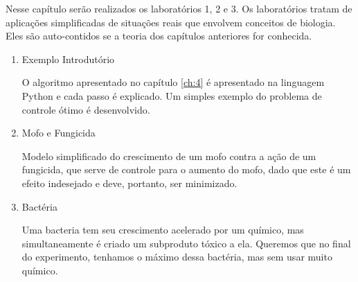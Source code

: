 Nesse capítulo serão realizados os laboratórios 1, 2 e 3. Os laboratórios
tratam de aplicações simplificadas de situações reais que envolvem conceitos
de biologia. Eles são auto-contidos se a teoria dos capítulos
anteriores for conhecida. 

\begin{enumerate}[label=\textbf{Lab \arabic*:}]
    \item Exemplo Introdutório
    
    O algoritmo apresentado no capítulo \ref{ch:4} é apresentado na linguagem
    Python e cada passo é explicado. Um simples exemplo do problema de
    controle ótimo é desenvolvido. 

    \item Mofo e Fungicida 
    
    Modelo simplificado do crescimento de um mofo contra a ação de um
    fungicida, que serve de controle para o aumento do mofo, dado que este é
    um efeito indesejado e deve, portanto, ser minimizado. 

    \item Bactéria 
    
    Uma bacteria tem seu crescimento acelerado por um químico, mas
    simultaneamente é criado um subproduto tóxico a ela. Queremos que no
    final do experimento, tenhamos o máximo dessa bactéria, mas sem usar muito
    químico. 
\end{enumerate}